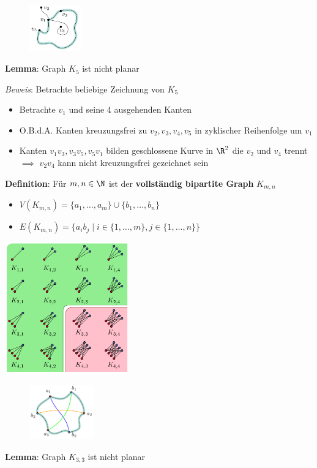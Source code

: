 \begin{figure}
	\centering
	\vspace{-40pt}
	\includegraphics[width=0.2\textwidth]{images/k5-p.png}
	\vspace{40pt}
	\vspace{-120pt}
\end{figure}
\textbf{Lemma}: Graph $K_5$ ist nicht planar

\textit{Beweis}: Betrachte beliebige Zeichnung von $K_5$
\begin{itemize}
	\item Betrachte $v_1$ und seine 4 ausgehenden Kanten
	\item O.B.d.A. Kanten kreuzungsfrei zu $v_2,v_3,v_4,v_5$ in zyklischer Reihenfolge um $v_1$
	\item Kanten $v_1v_3, v_3v_5, v_5v_1$ bilden geschlossene Kurve in $\R^2$ die $v_2$ und $v_4$ trennt $\implies$ $v_2v_4$ kann nicht kreuzungsfrei gezeichnet sein
\end{itemize}
\bigskip
\textbf{Definition}: Für $m,n\in\N$ ist der \textbf{vollständig bipartite Graph} $K_{m,n}$
\begin{itemize}
	\item $V(K_{m,n})=\{a_1,\ldots,a_m\}\cup\{b_1,\ldots,b_n\}$
	\item $E(K_{m,n})=\{a_ib_j \mid i \in\{1, \ldots, m\}, j \in\{1, \ldots,n\}\}$
\end{itemize}
\begin{center}
	\includegraphics[width=0.4\textwidth]{images/bg.png}
\end{center}

\begin{figure}
	\centering
	\includegraphics[width=0.25\textwidth]{images/k33-p.png}
	\vspace{-50pt}
\end{figure}
\textbf{Lemma}: Graph $K_{3,3}$ ist nicht planar

